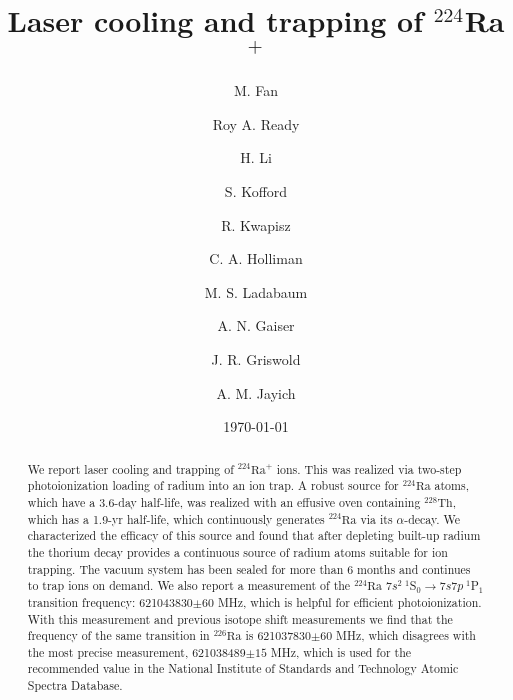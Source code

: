 \documentclass[
 reprint,
 amsmath,amssymb,
 aps,
 prr,
 superscriptaddress,
]{revtex4-2}
\newcommand{\iso}[2]{\ensuremath{^{#2}\mathrm{#1}}}
\begin{document}

\title{Laser cooling and trapping of \texorpdfstring{$^{224}$Ra$^+$}{Ra-224 ions}}

\author{M. Fan}
\author{Roy A. Ready}
\author{H. Li}
\author{S. Kofford}
\author{R. Kwapisz}
\author{C. A. Holliman}
\author{M. S. Ladabaum}
\author{A. N. Gaiser}
\author{J. R. Griswold}
\author{A. M. Jayich}

\date{\today}

\begin{abstract}
We report laser cooling and trapping of \iso{Ra}{224}$^+$ ions.  This was realized via two-step photoionization loading of radium into an ion trap.  A robust source for \iso{Ra}{224} atoms, which have a 3.6-day half-life, was realized with an effusive oven containing \iso{Th}{228}, which has a 1.9-yr half-life, which continuously generates \iso{Ra}{224} via its $\alpha$-decay.  We characterized the efficacy of this source and found that after depleting built-up radium the thorium decay provides a continuous source of radium atoms suitable for ion trapping. The vacuum system has been sealed for more than 6 months and continues to trap ions on demand.  We also report a measurement of the \iso{Ra}{224} \mbox{$7s^2\ ^1$S$_0 \rightarrow 7s7p\ ^1$P$_1$} transition frequency: \SI{621043830}{}$\pm60$ MHz, which is helpful for efficient photoionization.  With this measurement and previous isotope shift measurements we find that the frequency of the same transition in \iso{Ra}{226} is \SI{621037830}{}$\pm60$ MHz, which disagrees with the most precise measurement, \SI{621038489}{}$\pm15$ MHz, which is used for the recommended value in the National Institute of Standards and Technology Atomic Spectra Database.
\end{abstract}

\maketitle
\end{document}
